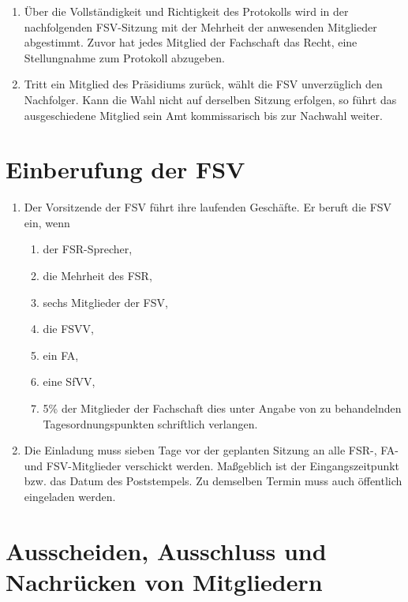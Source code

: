 \documentclass{article}
\providecommand{\tightlist}{\setlength{\itemsep}{0pt}\setlength{\parskip}{0pt}}
\begin{document}
\begin{enumerate}[(1)]
	\item Über die Vollständigkeit und Richtigkeit des Protokolls wird in der nachfolgenden FSV-Sitzung mit der Mehrheit der anwesenden Mitglieder abgestimmt. Zuvor hat jedes Mitglied der Fachschaft das Recht, eine Stellungnahme zum Protokoll abzugeben.
	\item Tritt ein Mitglied des Präsidiums zurück, wählt die FSV unverzüglich den Nachfolger. Kann die Wahl nicht auf derselben Sitzung erfolgen, so führt das ausgeschiedene Mitglied sein Amt kommissarisch bis zur Nachwahl weiter.
\end{enumerate}

\section{Einberufung der FSV}\label{einberufung-der-fsv}

\begin{enumerate}[(1)]
	\item Der Vorsitzende der FSV führt ihre laufenden Geschäfte. Er beruft die FSV ein, wenn
	\begin{enumerate}[1.]
		\tightlist
		\item der FSR-Sprecher,
		\item die Mehrheit des FSR,
		\item sechs Mitglieder der FSV,
		\item die FSVV,
		\item ein FA,
		\item eine SfVV,
		\item 5\% der Mitglieder der Fachschaft dies unter Angabe von zu behandelnden Tagesordnungspunkten schriftlich verlangen.
	\end{enumerate}
	\item Die Einladung muss sieben Tage vor der geplanten Sitzung an alle FSR-, FA- und FSV-Mitglieder verschickt werden. Maßgeblich ist der Eingangszeitpunkt bzw. das Datum des Poststempels. Zu demselben Termin muss auch öffentlich eingeladen werden.
\end{enumerate}

\section{Ausscheiden, Ausschluss und Nachrücken von Mitgliedern}\label{ausscheiden-ausschluss-und-nachruxfccken-von-mitgliedern}
\end{document}
